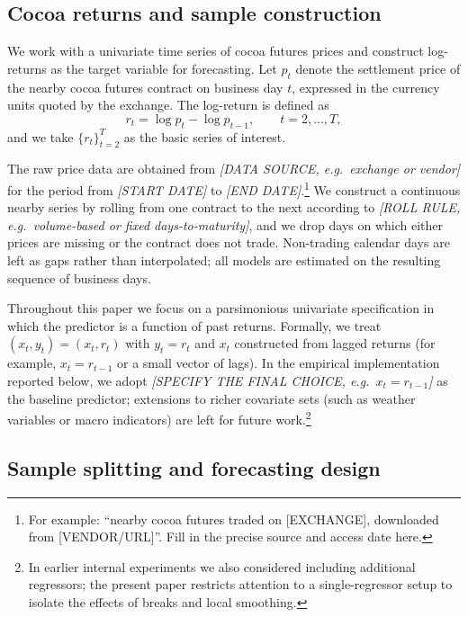 \documentclass[11pt]{article}
\newcommand{\1}{\mathbf{1}}
\begin{document}
\subsection{Cocoa returns and sample construction}
\label{subsec:data-construction}

We work with a univariate time series of cocoa futures prices and construct log-returns as the target variable for forecasting.
Let $p_t$ denote the settlement price of the nearby cocoa futures contract on business day $t$, expressed in the currency units quoted by the exchange.
The log-return is defined as
\begin{equation}
  r_t = \log p_t - \log p_{t-1}, \qquad t = 2,\dots,T,
\end{equation}
and we take $\{r_t\}_{t=2}^T$ as the basic series of interest.

The raw price data are obtained from \emph{[DATA SOURCE, e.g.\ exchange or vendor]} for the period from \emph{[START DATE]} to \emph{[END DATE]}.\footnote{%
  For example: ``nearby cocoa futures traded on [EXCHANGE], downloaded from [VENDOR/URL]''. Fill in the precise source and access date here.
}
We construct a continuous nearby series by rolling from one contract to the next according to \emph{[ROLL RULE, e.g.\ volume-based or fixed days-to-maturity]}, and we drop days on which either prices are missing or the contract does not trade.
Non-trading calendar days are left as gaps rather than interpolated; all models are estimated on the resulting sequence of business days.

Throughout this paper we focus on a parsimonious univariate specification in which the predictor is a function of past returns.
Formally, we treat $(x_t,y_t) = (x_t,r_t)$ with $y_t = r_t$ and $x_t$ constructed from lagged returns (for example, $x_t = r_{t-1}$ or a small vector of lags).
In the empirical implementation reported below, we adopt \emph{[SPECIFY THE FINAL CHOICE, e.g.\ $x_t = r_{t-1}$]} as the baseline predictor; extensions to richer covariate sets (such as weather variables or macro indicators) are left for future work.\footnote{%
  In earlier internal experiments we also considered including additional regressors; the present paper restricts attention to a single-regressor setup to isolate the effects of breaks and local smoothing.
}

\subsection{Sample splitting and forecasting design}
\label{subsec:data-sample-split}
\end{document}
